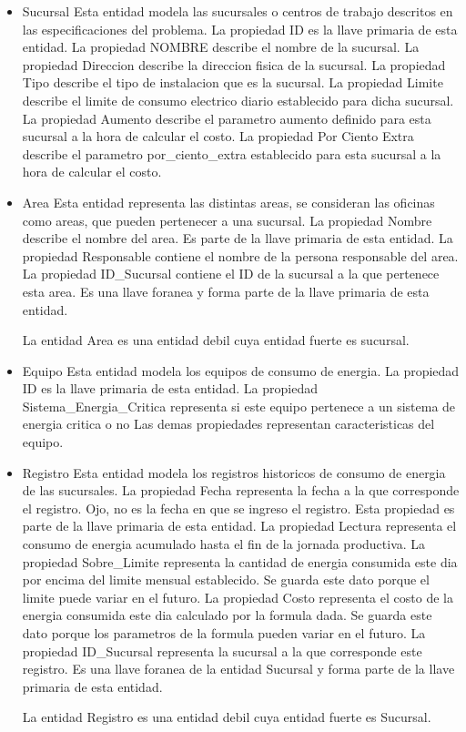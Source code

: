 \documentclass{article}
\begin{document}
\begin{itemize}
\item Sucursal
Esta entidad modela las sucursales o centros de trabajo descritos en las especificaciones del problema.
La propiedad ID es la llave primaria de esta entidad.
La propiedad NOMBRE describe el nombre de la sucursal.
La propiedad Direccion describe la direccion fisica de la sucursal.
La propiedad Tipo describe el tipo de instalacion que es la sucursal.
La propiedad Limite describe el limite de consumo electrico diario establecido para dicha sucursal.
La propiedad Aumento describe el parametro aumento definido para esta sucursal a la hora de calcular el costo.
La propiedad Por Ciento Extra describe el parametro por\_ciento\_extra establecido para esta sucursal a la hora de calcular el costo.
\item Area
Esta entidad representa las distintas areas, se consideran las oficinas como areas, que pueden pertenecer a una sucursal.
La propiedad Nombre describe el nombre del area. Es parte de la llave primaria de esta entidad.
La propiedad Responsable contiene el nombre de la persona responsable del area.
La propiedad ID\_Sucursal contiene el ID de la sucursal a la que pertenece esta area. Es una llave foranea y forma parte de la llave primaria de esta entidad.

La entidad Area es una entidad debil cuya entidad fuerte es sucursal.
\item Equipo
Esta entidad modela los equipos de consumo de energia.
La propiedad ID es la llave primaria de esta entidad.
La propiedad Sistema\_Energia\_Critica representa si este equipo pertenece a un sistema de energia critica o no
Las demas propiedades representan caracteristicas del equipo.
\item Registro
Esta entidad modela los registros historicos de consumo de energia de las sucursales.
La propiedad Fecha representa la fecha a la que corresponde el registro. Ojo, no es la fecha en que se ingreso el registro. Esta propiedad es parte de la llave primaria de esta entidad.
La propiedad Lectura representa el consumo de energia acumulado hasta el fin de la jornada productiva.
La propiedad Sobre\_Limite representa la cantidad de energia consumida este dia por encima del limite mensual establecido. Se guarda este dato porque el limite puede variar en el futuro.
La propiedad Costo representa el costo de la energia consumida este dia calculado por la formula dada. Se guarda este dato porque los parametros de la formula pueden variar en el futuro.
La propiedad ID\_Sucursal representa la sucursal a la que corresponde este registro. Es una llave foranea de la entidad Sucursal y forma parte de la llave primaria de esta entidad.

La entidad Registro es una entidad debil cuya entidad fuerte es Sucursal.
\end{itemize}
\end{document}
